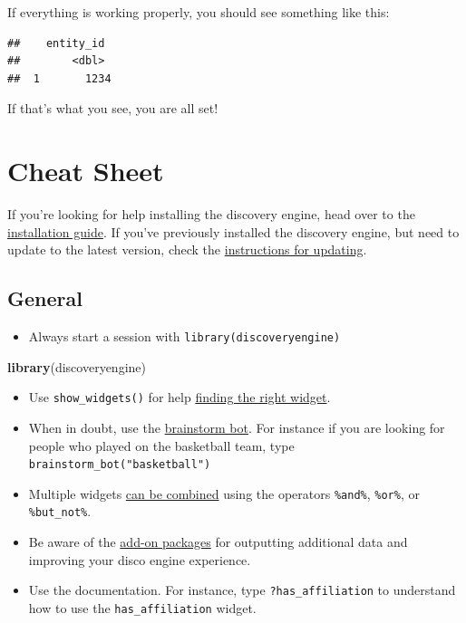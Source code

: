 \documentclass[]{book}
\newenvironment{Shaded}{\begin{snugshade}}{\end{snugshade}}
\newcommand{\KeywordTok}[1]{\textcolor[rgb]{0.13,0.29,0.53}{\textbf{#1}}}
\newcommand{\NormalTok}[1]{#1}
\providecommand{\tightlist}{%
  \setlength{\itemsep}{0pt}\setlength{\parskip}{0pt}}
\begin{document}
If everything is working properly, you should see something like this:

\begin{verbatim}
##    entity_id
##        <dbl>
##  1       1234
\end{verbatim}

If that's what you see, you are all set!

\hypertarget{cheat-sheet}{%
\chapter{Cheat Sheet}\label{cheat-sheet}}

If you're looking for help installing the discovery engine, head over to the \href{https://cwolfsonseeley.github.io/discodocs/installation.html}{installation guide}. If you've previously installed the discovery engine, but need to update to the latest version, check the \href{https://cwolfsonseeley.github.io/discodocs/updating.html}{instructions for updating}.

\hypertarget{general}{%
\section{General}\label{general}}

\begin{itemize}
\tightlist
\item
  Always start a session with \texttt{library(discoveryengine)}
\end{itemize}

\begin{Shaded}
\begin{Highlighting}[]
\KeywordTok{library}\NormalTok{(discoveryengine)}
\end{Highlighting}
\end{Shaded}

\begin{itemize}
\tightlist
\item
  Use \texttt{show\_widgets()} for help \protect\hyperlink{working-with-finding-widgets}{finding the right widget}.
\item
  When in doubt, use the \protect\hyperlink{brainstorm-bot}{brainstorm bot}. For instance if you are looking for people who played on the basketball team, type \texttt{brainstorm\_bot("basketball")}
\item
  Multiple widgets \protect\hyperlink{combining-widgets}{can be combined} using the operators \texttt{\%and\%}, \texttt{\%or\%}, or \texttt{\%but\_not\%}.
\item
  Be aware of the \protect\hyperlink{add-on-packages}{add-on packages} for outputting additional data and improving your disco engine experience.
\item
  Use the documentation. For instance, type \texttt{?has\_affiliation} to understand how to use the \texttt{has\_affiliation} widget.
\end{itemize}
\end{document}
